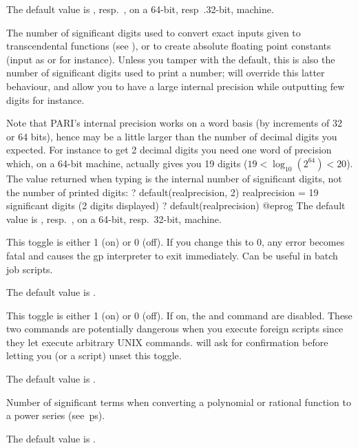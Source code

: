 {The default value is , resp.~, on a 64-bit, resp~.32-bit,
machine.

\label{se:def,realprecision}
The number of significant digits used to convert exact inputs given to
transcendental functions (see ), or to create
absolute floating point constants (input as  or  for
instance). Unless you tamper with the  default, this is also
the number of significant digits used to print a  number;
 will override this latter behaviour, and allow you to have a
large internal precision while outputting few digits for instance.

Note that PARI's internal precision works on a word basis (by increments of
32 or 64 bits), hence may be a little larger than the number of decimal
digits you expected. For instance to get 2 decimal digits you need one word
of precision which, on a 64-bit machine, actually gives you 19 digits ($19 <
\log_{10}(2^{64}) < 20$). The value returned when typing
 is the internal number of significant digits,
not the number of printed digits:
\bprog
? default(realprecision, 2)
      realprecision = 19 significant digits (2 digits displayed)
? default(realprecision)
@eprog
The default value is , resp.~, on a 64-bit, resp.~32-bit,
machine.

\label{se:def,recover}
This toggle is either 1 (on) or 0 (off). If you change this to $0$, any
error becomes fatal and causes the gp interpreter to exit immediately. Can be
useful in batch job scripts.

The default value is .

\label{se:def,secure}
This toggle is either 1 (on) or 0 (off). If on, the  and
 command are disabled. These two commands are potentially
dangerous when you execute foreign scripts since they let  execute
arbitrary UNIX commands.  will ask for confirmation before letting
you (or a script) unset this toggle.

The default value is .

\label{se:def,seriesprecision}
Number of significant terms
when converting a polynomial or rational function to a power series
(see~\b{ps}).

The default value is .

}
